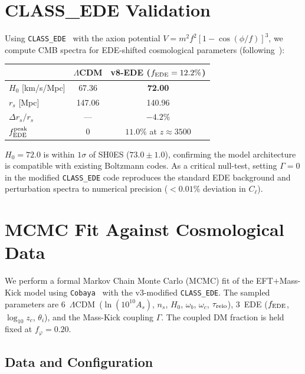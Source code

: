 \documentclass[a4paper,11pt]{article}
\newcommand{\LCDM}{$\Lambda$CDM}
\newcommand{\fphi}{f_\varphi}
\begin{document}
\section{CLASS\_EDE Validation}
\label{sec:class}

Using \texttt{CLASS\_EDE}~\cite{ClassEDE} with the axion potential $V = m^2 f^2[1 - \cos(\phi/f)]^3$, we compute CMB spectra for EDE-shifted cosmological parameters (following~\cite{Poulin2019,Smith2020}):

\begin{center}
\begin{tabular}{lcc}
\toprule
& \textbf{\LCDM} & \textbf{v8-EDE} ($f_{\rm EDE} = 12.2\%$) \\
\midrule
$H_0$ [km/s/Mpc] & 67.36 & \textbf{72.00} \\
$r_s$ [Mpc] & 147.06 & 140.96 \\
$\Delta r_s / r_s$ & --- & $-4.2\%$ \\
$f_{\rm EDE}^{\rm peak}$ & 0 & $11.0\%$ at $z \approx 3500$ \\
\bottomrule
\end{tabular}
\end{center}

\noindent $H_0 = 72.0$ is within $1\sigma$ of SH0ES ($73.0 \pm 1.0$), confirming the model architecture is compatible with existing Boltzmann codes. As a critical null-test, setting $\Gamma = 0$ in the modified \texttt{CLASS\_EDE} code reproduces the standard EDE background and perturbation spectra to numerical precision ($<0.01\%$ deviation in $C_\ell$).


\section{MCMC Fit Against Cosmological Data}
\label{sec:mcmc}

We perform a formal Markov Chain Monte Carlo (MCMC) fit of the EFT$+$Mass-Kick model using \texttt{Cobaya}~\cite{Cobaya} with the v3-modified \texttt{CLASS\_EDE}. The sampled parameters are 6~\LCDM\ ($\ln(10^{10}A_s)$, $n_s$, $H_0$, $\omega_b$, $\omega_c$, $\tau_{\rm reio}$), 3~EDE ($f_{\rm EDE}$, $\log_{10}z_c$, $\theta_i$), and the Mass-Kick coupling $\Gamma$. The coupled DM fraction is held fixed at $\fphi = 0.20$.

\subsection{Data and Configuration}
\end{document}
